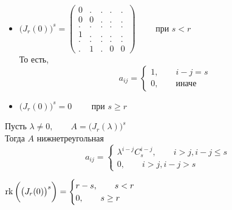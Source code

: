\begin{props}
	\item
	\begin{itemize}
		\item $ \bigg( J_r(0) \bigg)^s =
		\begin{pmatrix}
			0 & . & . & . & . \\
			0 & 0 & . & . & . \\
			. & . & . & . & . \\
			1 & . & . & . & . \\
			. & . & . & . & . \\
			. & 1 & . & 0 & 0
		\end{pmatrix} \qquad $ при $ s < r $ \\
		То есть,
		$$ a_{ij} =
		\begin{cases}
			1, \qquad i - j = s \\
			0, \qquad \text{иначе}
		\end{cases} $$

		\item $ \bigg( J_r(0) \bigg)^s = 0 \qquad $ при $ s \ge r $
	\end{itemize}

	\item Пусть $ \lambda \ne 0, \qquad A = \bigg( J_r(\lambda) \bigg)^s $ \\
	Тогда $ A $ нижнетреугольная
	$$ a_{ij} =
	\begin{cases}
		\lambda^{i - j}C_s^{i - j}, \qquad i > j, i - j \le s \\
		0, \qquad i > j, i - j > s
	\end{cases} $$

	\item $ \operatorname{rk} \bigg( \big( J_r(0) \big)^s \bigg) =
	\begin{cases}
		r - s, \qquad s < r \\
		0, \qquad s \ge r
	\end{cases} $
\end{props}

